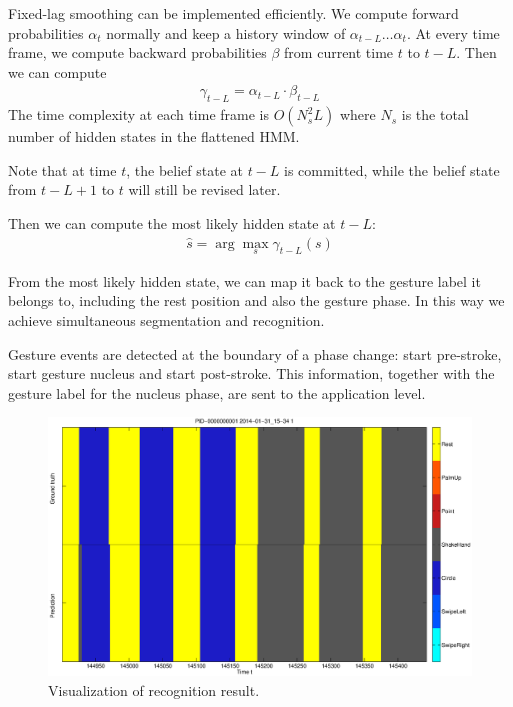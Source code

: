 \documentclass[conference]{IEEEtran}
\begin{document}
Fixed-lag smoothing can be implemented efficiently. We compute forward
probabilities $\alpha_t$ normally and keep a history window of $\alpha_{t -
L}\ldots\alpha_t$. At every time frame, we compute backward probabilities
$\beta$ from current time $t$ to $t - L$. Then we can compute
\begin{align}
\gamma_{t - L} = \alpha_{t - L} \cdot \beta_{t - L}
\end{align}  
The time complexity at each time frame is $O(N_s^2L)$ where $N_s$ is the total
number of hidden states in the flattened HMM.

Note that at time $t$, the belief state at $t - L$ is committed, while the belief state from $t - L + 1$ to $t$ will still be revised later.

Then we can compute the most likely hidden state at $t - L$:
\begin{align}
\hat{s} = \arg\max_s \gamma_{t - L}(s)
\end{align}

From the most likely hidden state, we can map it back to the gesture label it
belongs to, including the rest position and also the gesture phase. In this way
we achieve simultaneous segmentation and recognition.

Gesture events are detected at the boundary of a phase change: start pre-stroke,
start gesture nucleus and start post-stroke. This information, together with the
gesture label for the nucleus phase, are sent to the application level.

\begin{figure}[t]
\centering
\includegraphics[width=\columnwidth]{fig/circle_shake.eps}
\caption{Visualization of recognition result.}
\label{fig:visual_recog}
\end{figure}
\end{document}
